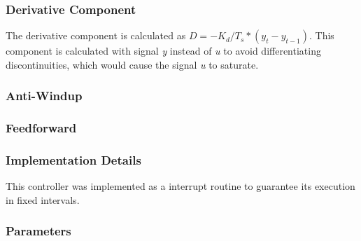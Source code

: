 \subsubsection{Derivative Component}
\label{sub:Derivative Component}

The derivative component is calculated as $ D = - K_d/T_s * (y_{t}-y_{t-1})$. This component is calculated with signal \emph{y} instead of \emph{u} to avoid differentiating discontinuities, which would cause the signal \emph{u} to saturate.

\subsubsection{Anti-Windup}
\label{sub:AntiWindup}

\subsubsection{Feedforward}
\label{sub:Feedforward}

\subsubsection{Implementation Details}
\label{sub:Implementation Details}

This controller was implemented as a interrupt routine to guarantee its execution in fixed intervals.

\subsubsection{Parameters}
\label{sub:Parameters}
